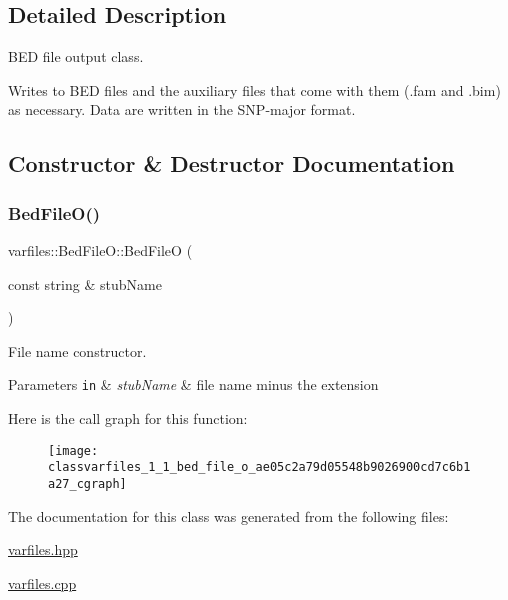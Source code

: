 \subsection{Detailed Description}
B\+ED file output class. 

Writes to B\+ED files and the auxiliary files that come with them (.fam and .bim) as necessary. Data are written in the S\+N\+P-\/major format. 

\subsection{Constructor \& Destructor Documentation}
\mbox{\label{classvarfiles_1_1_bed_file_o_ae05c2a79d05548b9026900cd7c6b1a27}} 
\subsubsection{\texorpdfstring{Bed\+File\+O()}{BedFileO()}}
{\footnotesize\ttfamily varfiles\+::\+Bed\+File\+O\+::\+Bed\+FileO (\begin{DoxyParamCaption}\item[{const string \&}]{stub\+Name }\end{DoxyParamCaption})\hspace{0.3cm}{\ttfamily [inline]}}



File name constructor. 


\begin{DoxyParams}[1]{Parameters}
\mbox{\tt in}  & {\em stub\+Name} & file name minus the extension \\
\hline
\end{DoxyParams}
Here is the call graph for this function\+:\nopagebreak
\begin{figure}[H]
\begin{center}
\leavevmode
\texttt{[image: classvarfiles\_1\_1\_bed\_file\_o\_ae05c2a79d05548b9026900cd7c6b1a27\_cgraph]}
\end{center}
\end{figure}


The documentation for this class was generated from the following files\+:\begin{DoxyCompactItemize}
\item 
\hyperlink{varfiles_8hpp}{varfiles.\+hpp}\item 
\hyperlink{varfiles_8cpp}{varfiles.\+cpp}\end{DoxyCompactItemize}
